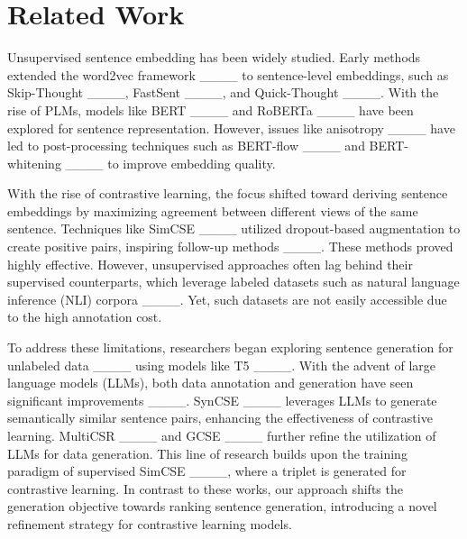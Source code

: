 \section{Related Work}
Unsupervised sentence embedding has been widely studied. Early methods extended the word2vec framework ____ to sentence-level embeddings, such as Skip-Thought ____, FastSent ____, and Quick-Thought ____. With the rise of PLMs, models like BERT ____ and RoBERTa ____ have been explored for sentence representation. However, issues like anisotropy ____ have led to post-processing techniques such as BERT-flow ____ and BERT-whitening ____ to improve embedding quality.

With the rise of contrastive learning, the focus shifted toward deriving sentence embeddings by maximizing agreement between different views of the same sentence. Techniques like SimCSE ____ utilized dropout-based augmentation to create positive pairs, inspiring follow-up methods ____. These methods proved highly effective. However, unsupervised approaches often lag behind their supervised counterparts, which leverage labeled datasets such as natural language inference (NLI) corpora ____. Yet, such datasets are not easily accessible due to the high annotation cost.

To address these limitations, researchers began exploring sentence generation for unlabeled data ____ using models like T5 ____. With the advent of large language models (LLMs), both data annotation and generation have seen significant improvements ____. SynCSE ____ leverages LLMs to generate semantically similar sentence pairs, enhancing the effectiveness of contrastive learning. MultiCSR ____ and GCSE ____ further refine the utilization of LLMs for data generation. This line of research builds upon the training paradigm of supervised SimCSE ____, where a triplet is generated for contrastive learning. In contrast to these works, our approach shifts the generation objective towards ranking sentence generation, introducing a novel refinement strategy for contrastive learning models.